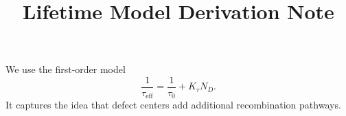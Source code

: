 \documentclass[11pt]{article}
\title{Lifetime Model Derivation Note}
\begin{document}
\maketitle

We use the first-order model
\[
\frac{1}{\tau_{\mathrm{eff}}} = \frac{1}{\tau_0} + K_\tau N_D.
\]
It captures the idea that defect centers add additional recombination pathways.
\end{document}
